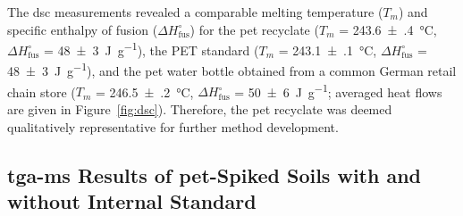 The \ac{dsc} measurements revealed a comparable melting temperature ($T_m$) and specific enthalpy of fusion ($\Delta H^\circ_\text{fus}$) for
the \ac{pet} recyclate ($T_m$ = \SI{243.6(4)}{\degreeCelsius}, $\Delta H^\circ_\text{fus}$ = \SI{48(3)}{\joule\per\gram}),
the PET standard ($T_m$ = \SI{243.1(1)}{\degreeCelsius}, $\Delta H^\circ_\text{fus}$ = \SI{48(3)}{\joule\per\gram}), and
the \ac{pet} water bottle obtained from a common German retail chain store ($T_m$ = \SI{246.5(2)}{\degreeCelsius}, $\Delta H^\circ_\text{fus}$ = \SI{50(6)}{\joule\per\gram}; averaged heat flows are given in Figure~\ref{fig:dsc}).
Therefore, the \ac{pet} recyclate was deemed qualitatively representative for further method development.

\subsection[\Acs{tga-ms} Results of \Acs{pet}-Spiked Soils]{\Acs{tga-ms} Results of \Acs{pet}-Spiked Soils with and without Internal Standard}

